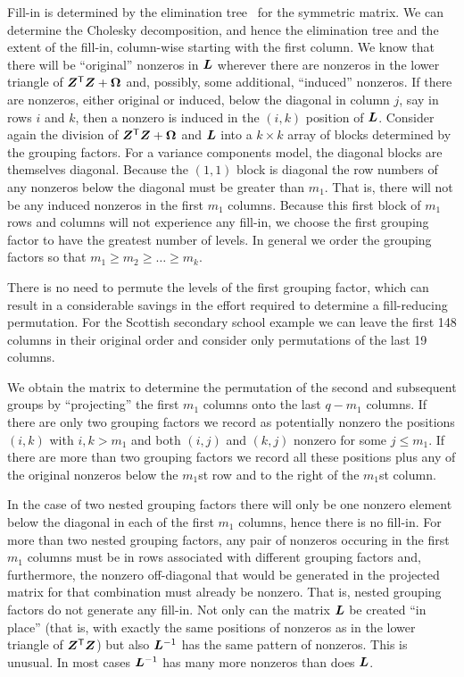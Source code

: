 \documentclass[12pt]{article}
\begin{document}
Fill-in is determined by the elimination tree~\citep{Liu:1990} for the
symmetric matrix.  We can determine the Cholesky decomposition, and
hence the elimination tree and the extent of the fill-in, column-wise
starting with the first column.  We know that there will be
``original'' nonzeros in $\bm{L}$ wherever there are nonzeros in the
lower triangle of $\bm{Z}^\mathsf{T}\bm{Z}+\bm{\Omega}$ and, possibly, some
additional, ``induced'' nonzeros.  If there are nonzeros, either
original or induced, below the diagonal in column $j$, say in rows
$i$ and $k$, then a nonzero is induced in the $(i,k)$ position of
$\bm{L}$.  Consider again the division of $\bm{Z}^\mathsf{T}\bm{Z}+\bm{\Omega}$ and
$\bm{L}$ into a $k\times k$ array of blocks determined by the grouping
factors.  For a variance components model, the diagonal blocks are
themselves diagonal.  Because the $(1,1)$ block is diagonal the row
numbers of any nonzeros below the diagonal must be greater than $m_1$.
That is, there will not be any induced nonzeros in the first $m_1$
columns. Because this first block of $m_1$ rows and columns will not
experience any fill-in, we choose the first grouping factor to have
the greatest number of levels.  In general we order the grouping
factors so that $m_1\ge m_2\ge\dots\ge m_k$.

There is no need to permute the levels of the first grouping
factor, which can result in a considerable savings in the effort required to
determine a fill-reducing permutation.  For the Scottish secondary
school example we can leave the first 148 columns in their original
order and consider only permutations of the last 19 columns.

We obtain the matrix to determine the permutation of the second and
subsequent groups by ``projecting'' the first $m_1$ columns onto the
last $q-m_1$ columns.  If there are only two
grouping factors we record as potentially nonzero the positions $(i,k)$
with $i,k>m_1$ and both $(i,j)$ and $(k,j)$ nonzero for some
$j\le m_1$.  If there are more than two grouping factors we
record all these positions plus any of the original nonzeros below the
$m_1$st row and to the right of the $m_1$st column.

In the case of two nested grouping factors there will only be one
nonzero element below the diagonal in each of the first $m_1$ columns,
hence there is no fill-in.  For more than two nested grouping factors,
any pair of nonzeros occuring in the first $m_1$ columns must be in
rows associated with different grouping factors and, furthermore, the
nonzero off-diagonal that would be generated in the projected matrix
for that combination must already be nonzero.  That is, nested
grouping factors do not generate any fill-in.  Not only can the matrix
$\bm{L}$ be created ``in place'' (that is, with exactly the same
positions of nonzeros as in the lower triangle of $\bm{Z}^\mathsf{T}\bm{Z}$) but
also $\bm{L}^{-1}$ has the same pattern of nonzeros.  This is unusual.
In most cases $\bm{L}^{-1}$ has many more nonzeros than does $\bm{L}$.
\end{document}
